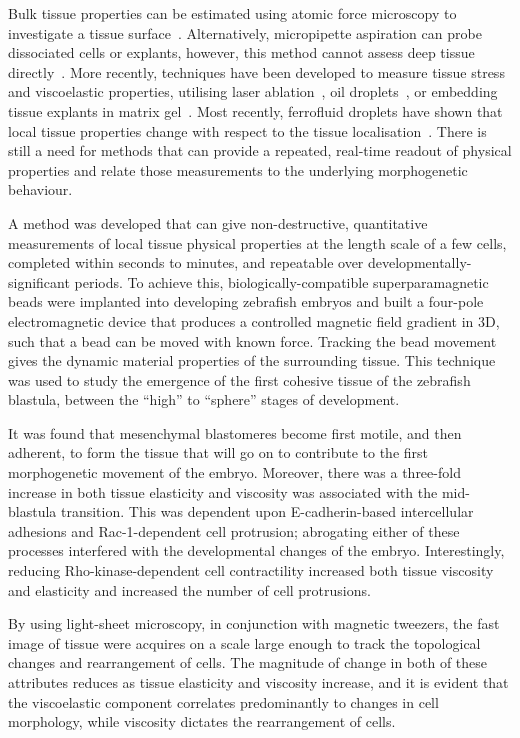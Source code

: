 Bulk tissue properties can be estimated using atomic force microscopy to investigate a tissue surface~\cite{18}.
Alternatively, micropipette aspiration can probe dissociated cells or explants, however, this method cannot assess deep tissue directly~\cite{14,15}.
More recently, techniques have been developed to measure tissue stress and viscoelastic properties, utilising laser ablation~\cite{17}, oil droplets~\cite{18}, or embedding tissue explants in matrix gel~\cite{16}.
Most recently, ferrofluid droplets have shown that local tissue properties change with respect to the tissue localisation~\cite{18}. %
There is still a need for methods that can provide a repeated, real-time readout of physical properties and relate those measurements to the underlying morphogenetic behaviour.

A method was developed that can give non-destructive, quantitative measurements of local tissue physical properties at the length scale of a few cells, completed within seconds to minutes, and repeatable over developmentally-significant periods.
To achieve this, biologically-compatible superparamagnetic beads were implanted into developing \gls{zebrafish} embryos and built a four-pole electromagnetic device that produces a controlled magnetic field gradient in 3D, such that a bead can be moved with known force.
Tracking the bead movement gives the dynamic material properties of the surrounding tissue. %
This technique was used to study the emergence of the first cohesive tissue of the \gls{zebrafish} blastula, between the “high” to “sphere” stages of development.

It was found that mesenchymal blastomeres become first motile, and then adherent, to form the tissue that will go on to contribute to the first morphogenetic movement of the embryo.
Moreover, there was a three-fold increase in both tissue elasticity and viscosity was associated with the mid-blastula transition.
This was dependent upon E-cadherin-based intercellular adhesions and Rac-1-dependent cell protrusion; abrogating either of these processes interfered with the developmental changes of the embryo.
Interestingly, reducing Rho-kinase-dependent cell contractility increased both tissue viscosity and elasticity and increased the number of cell protrusions.

By using light-sheet microscopy, in conjunction with magnetic tweezers, the fast image of tissue were acquires on a scale large enough to track the topological changes and rearrangement of cells.
The magnitude of change in both of these attributes reduces as tissue elasticity and viscosity increase, and it is evident that the viscoelastic component correlates predominantly to changes in cell morphology, while viscosity dictates the rearrangement of cells.

